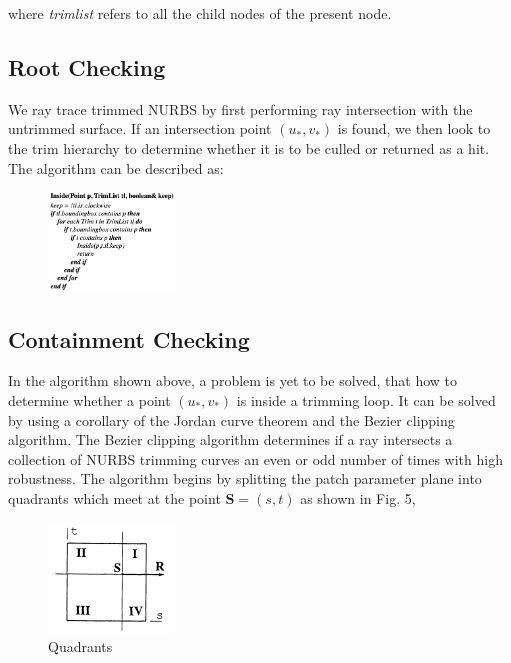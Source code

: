 \documentclass[acmtog]{acmart}
\begin{document}
where \textit{trimlist} refers to all the child nodes of the present node.

\subsection{Root Checking}
\hspace*{8pt}
We ray trace trimmed NURBS by first performing ray intersection with the untrimmed surface. If an intersection point $\left(u_*, v_*\right)$ is found, we then look to the trim hierarchy to determine whether it is to be culled or returned as a hit. The algorithm can be described as:
\begin{figure}[htbp]
    \centering
    \includegraphics[width=0.3\textwidth, height=0.25\textwidth]{algo2.png}
\end{figure}

\subsection{Containment Checking}
\hspace*{8pt}
In the algorithm shown above, a problem is yet to be solved, that how to determine whether a point $(u_*,v_*)$ is inside a trimming loop. It can be solved by using a corollary of the Jordan curve theorem and the Bezier clipping algorithm. The Bezier clipping algorithm determines if a ray intersects a collection of NURBS trimming curves an even or odd number of times with high robustness. The algorithm begins by splitting the patch parameter plane into quadrants which meet at the point $\mathbf{S} = (s, t)$ as shown in Fig. 5, 

\begin{figure}[htbp]
    \centering
    \includegraphics[width=0.3\textwidth, height=0.25\textwidth]{quadrants.png}
    \caption{Quadrants}
\end{figure}
\end{document}

